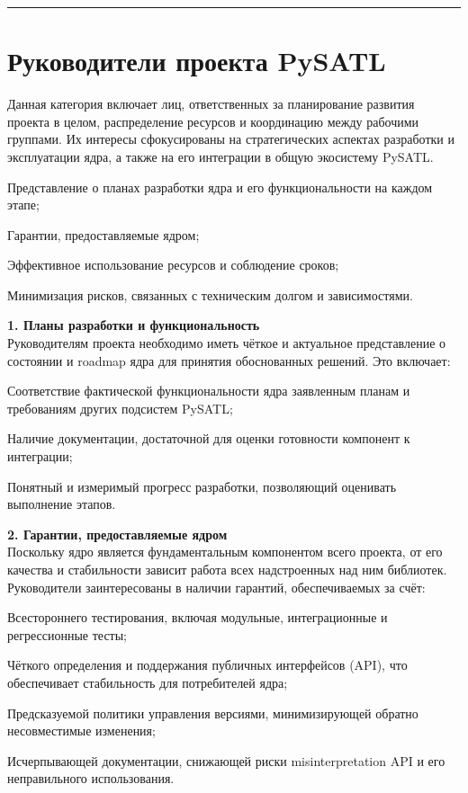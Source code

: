 \noindent\rule{\textwidth}{0.5pt}
\section{Руководители проекта PySATL}

Данная категория включает лиц, ответственных за планирование развития проекта в целом, распределение ресурсов и координацию между рабочими группами. Их интересы сфокусированы на стратегических аспектах разработки и эксплуатации ядра, а также на его интеграции в общую экосистему PySATL.

\begin{itemizecmp}
    \item Представление о планах разработки ядра и его функциональности на каждом этапе;
    \item Гарантии, предоставляемые ядром;
    \item Эффективное использование ресурсов и соблюдение сроков;
    \item Минимизация рисков, связанных с техническим долгом и зависимостями.
\end{itemizecmp}

\textbf{1. Планы разработки и функциональность} \\
Руководителям проекта необходимо иметь чёткое и актуальное представление о состоянии и roadmap ядра для принятия обоснованных решений. Это включает:
\begin{itemizecmp}
    \item Соответствие фактической функциональности ядра заявленным планам и требованиям других подсистем PySATL;
    \item Наличие документации, достаточной для оценки готовности компонент к интеграции;
    \item Понятный и измеримый прогресс разработки, позволяющий оценивать выполнение этапов.
\end{itemizecmp}

\textbf{2. Гарантии, предоставляемые ядром} \\
Поскольку ядро является фундаментальным компонентом всего проекта, от его качества и стабильности зависит работа всех надстроенных над ним библиотек. Руководители заинтересованы в наличии гарантий, обеспечиваемых за счёт:
\begin{itemizecmp}
    \item Всестороннего тестирования, включая модульные, интеграционные и регрессионные тесты;
    \item Чёткого определения и поддержания публичных интерфейсов (API), что обеспечивает стабильность для потребителей ядра;
    \item Предсказуемой политики управления версиями, минимизирующей обратно несовместимые изменения;
    \item Исчерпывающей документации, снижающей риски misinterpretation API и его неправильного использования.
\end{itemizecmp}

